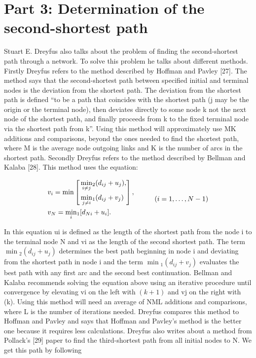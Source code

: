 \documentclass{article}
\begin{document}
\newpage

\section{Part 3: Determination of the second-shortest path}
Stuart E. Dreyfus also talks about the problem of finding the second-shortest 
path through a network. To solve this problem he talks about different methods. 
Firstly Dreyfus refers to the method described by Hoffman and Pavley [27]. 
The method says that the second-shortest path between specified  initial and terminal 
nodes is the deviation from the shortest path. The deviation from the shortest path is 
defined “to be a path that coincides with the shortest path (j may be the origin or the
terminal node), then deviates directly to some node k not the next node of the shortest
path, and finally proceeds from k to the fixed terminal node via the shortest path 
from k”. Using this method will approximately use MK additions and comparisons, beyond
the ones needed to find the shortest path, where M is the average node outgoing 
links and K is the number of arcs in the shortest path. 
\vspace{2mm}
Secondly Dreyfus refers to the method described by Bellman and Kalaba
[28]. This method uses the equation:

\begin{equation}
    \begin{aligned}
        & v_{i} = \min \left[
        \begin{aligned} 
            & \min_{i \neq j}\!_2(d_{ij} + u_{j}), \\
            & \min_{j \neq i}\!_1(d_{ij} + v_{j})
        \end{aligned} 
        \right],\\
        & v_{N} = \min_{i}\!_1[d_{Ni} + u_{i}].
    \end{aligned}
    \hspace*{3em} (i = 1, \dots, N - 1) 
\end{equation}

\noindent In this equation ui is defined as the length of the shortest path from the node i
to the terminal node N and vi as the length of the second shortest path. 
The term $\min \!_2(d_{ij}+u_j)$ determines the best path beginning in node i 
and deviating from the shortest path in node i and the term $\min\!_1(d_{ij}+v_j) $
evaluates the best path with any first arc and the second best continuation. 
Bellman and Kalaba recommends solving the equation above using an iterative procedure 
until convergence by elevating vi on the left with $(k+1)$ and vj on the right with (k). 
Using this method will need an average of NML additions and comparisons, where L is the 
number of iterations needed. Dreyfus compares this method to Hoffman and Pavley and 
says that Hoffman and Pavley's method is the better one because it requires less 
calculations.
\vspace{2mm}
Dreyfus also writes about a method from Pollack's [29] paper to find the 
third-shortest path from all initial nodes to N. We get this path by following
\end{document}

